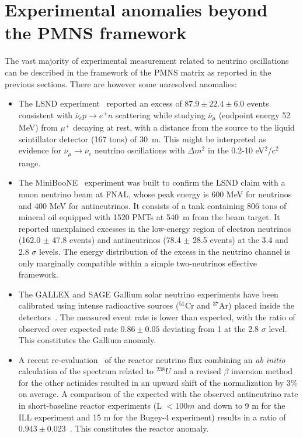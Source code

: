 \section{Experimental anomalies beyond the PMNS framework}
\label{sec:anomalies}

The vast majority of experimental measurement related to neutrino oscillations can be described in the framework of the PMNS matrix as reported in the previous sections. There are however some unresolved anomalies: 
\begin{itemize}
\item The LSND experiment~\cite{lsnd} reported an excess of $87.9 \pm 22.4 \pm 6.0$ events consistent with $\bar{\nu}_e p \rightarrow e^+ n$ scattering while studying $\bar{\nu}_\mu$ (endpoint energy 52 MeV) from $\mu^+$ decaying at rest, with a distance from the source to the liquid scintillator detector (167 tons) of 30~m. This might be interpreted as evidence for $\bar{\nu}_\mu \rightarrow  \bar{\nu}_e$ neutrino oscillations with $\Delta m^2$ in the 0.2-10 eV$^2$/c$^2$ range.
\item The MiniBooNE~\cite{miniboone1,miniboone2} experiment was built to confirm the LSND claim with a muon neutrino beam at FNAL, whose peak energy is 600 MeV for neutrinos and 400 MeV for antineutrinos. It consists of a tank containing 806 tons of mineral oil equipped with 1520 PMTs at 540~m from the beam target. It reported unexplained excesses in the low-energy region of electron neutrinos (162.0 $\pm$ 47.8 events) and antineutrinos (78.4 $\pm$ 28.5 events) at the 3.4 and 2.8 $\sigma$ levels. The energy distribution of the excess in the neutrino channel is only marginally compatible within a simple two-neutrinos effective framework. 
\item The GALLEX and SAGE Gallium solar neutrino experiments have been calibrated using intense radioactive sources ($^{51}$Cr and $^{37}$Ar) placed inside the detectors~\cite{gallium}. The measured event rate is lower than expected, with the ratio of observed over expected rate $0.86\pm 0.05$ deviating from 1 at the 2.8 $ \sigma$ level. This constitutes the Gallium anomaly. 
\item A recent re-evaluation~\cite{mueller} of the reactor neutrino flux combining an {\it ab initio} calculation of the spectrum related to $^{238} U$ and a revised $\beta$ inversion method for the other actinides resulted in an upward shift of the normalization by 3\% on average. A comparison of the expected with the observed antineutrino rate in short-baseline reactor experiments (L $< 100 m$ and down to 9 m for the ILL experiment and 15 m for the Bugey-4 experiment) results in a ratio of $ 0.943 \pm 0.023$~\cite{mention}. This constitutes the reactor anomaly. 
\end{itemize}

